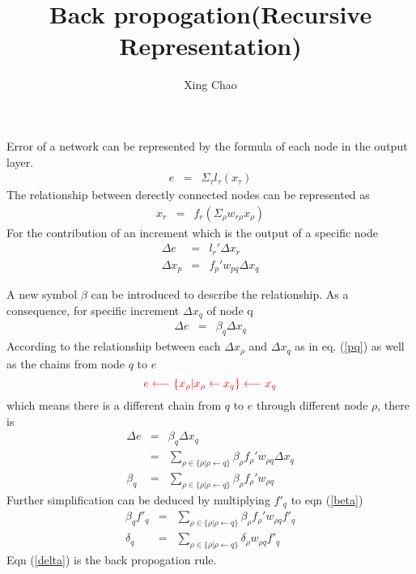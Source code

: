 \documentclass{article}
\newcommand{\tmcolor}[2]{{\color{#1}{#2}}}
\begin{document}
\title{Back propogation(Recursive Representation)}

\author{
  
  \and
  Xing Chao
}

\maketitle

Error of a network can be represented by the formula of each node in the
output layer.
\begin{eqnarray*}
  e & = & \Sigma_{\tau} l_{\tau} (x_{\tau})
\end{eqnarray*}
The relationship between derectly connected nodes can be represented as
\begin{eqnarray*}
  x_r & = & f_r (\Sigma_{\rho} w_{r \rho} x_{\rho})
\end{eqnarray*}
For the contribution of an increment which is the output of a specific node
\begin{eqnarray}
  \Delta e & = & l_r' \Delta x_r \nonumber\\
  \Delta x_p & = & f_p' w_{p q} \Delta x_q  \label{pq}
\end{eqnarray}


A new symbol $\beta$ can be introduced to describe the relationship. As a
consequence, for specific increment $\Delta x_q$ of node q
\begin{eqnarray*}
  \Delta e & = & \beta_q \Delta x_q
\end{eqnarray*}
According to the relationship between each $\Delta x_{\rho}$ and $\Delta x_q$
as in eq. (\ref{pq}) as well as the chains from node $q$ to $e$
\[ \tmcolor{red}{e \longleftarrow \{ x_{\rho} |x_{\rho} \leftarrow x_q \}
   \longleftarrow x_q} \]
which means there is a different chain from $q$ to $e$ through different node
$\rho$, there is
\begin{eqnarray}
  \Delta e & = & \beta_q \Delta x_q \nonumber\\
  & = & \sum_{\rho \in \{ \rho | \rho \leftarrow q \}} \beta_{\rho} f_{\rho}'
  w_{\rho q} \Delta x_q \nonumber\\
  \beta_q & = & \sum_{\rho \in \{ \rho | \rho \leftarrow q \}} \beta_{\rho}
  f_{\rho}' w_{\rho q}  \label{beta}
\end{eqnarray}
Further simplification can be deduced by multiplying $f'_q$ to eqn
(\ref{beta})
\begin{eqnarray}
  \beta_q f'_q & = & \sum_{\rho \in \{ \rho | \rho \leftarrow q \}}
  \beta_{\rho} f_{\rho}' w_{\rho q} f'_q \nonumber\\
  \delta_q & = & \sum_{\rho \in \{ \rho | \rho \leftarrow q \}} \delta_{\rho}
  w_{\rho q} f'_q  \label{delta}
\end{eqnarray}
Eqn (\ref{delta}) is the back propogation rule.
\end{document}
